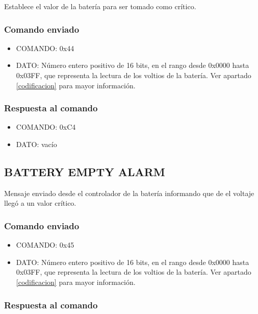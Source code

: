 \documentclass[a4paper,10pt]{article}
\begin{document}
Establece el valor de la bater\'ia para ser tomado como cr\'itico.

\subsubsection*{Comando enviado}

\begin{itemize}
	\item{COMANDO:} 0x44
	\item{DATO:} N\'umero entero positivo de 16 bits, en el rango desde 0x0000 hasta 0x03FF, que representa la lectura de los voltios de la bater\'ia.
		Ver apartado \ref{codificacion} para mayor informaci\'on.
\end{itemize}

\subsubsection*{Respuesta al comando}

\begin{itemize}
	\item{COMANDO:} 0xC4
	\item{DATO:} vac\'io
\end{itemize}

\subsection{BATTERY EMPTY ALARM}
\label{battery_empty}

Mensaje enviado desde el controlador de la bater\'ia informando que de el voltaje lleg\'o a un valor cr\'itico.

\subsubsection*{Comando enviado}

\begin{itemize}
	\item{COMANDO:} 0x45
	\item{DATO:} N\'umero entero positivo de 16 bits, en el rango desde 0x0000 hasta 0x03FF, que representa la lectura de los voltios de la bater\'ia.
		Ver apartado \ref{codificacion} para mayor informaci\'on.
\end{itemize}

\subsubsection*{Respuesta al comando}
\end{document}

